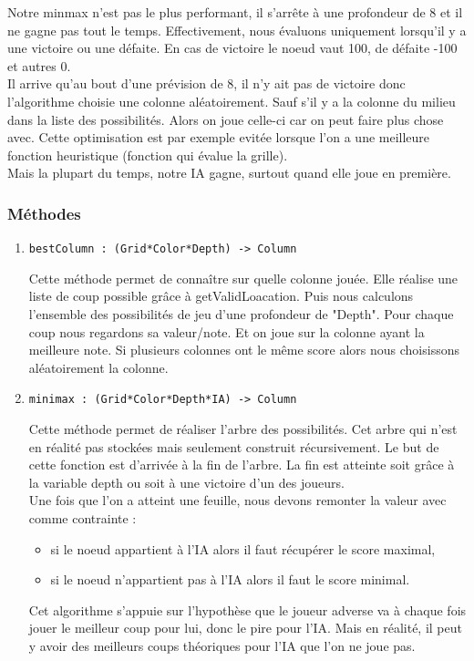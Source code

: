 \documentclass[11pt]{article}
\begin{document}
Notre minmax n'est pas le plus performant, il s'arrête à une profondeur de 8
et il ne gagne pas tout le temps. Effectivement, nous évaluons uniquement
lorsqu'il y a une victoire ou une défaite. En cas de victoire le noeud vaut
100, de défaite -100 et autres 0.\\

Il arrive qu'au bout d'une prévision de 8, il n'y ait pas de victoire donc
l'algorithme choisie une colonne aléatoirement. Sauf s'il y a la colonne du
milieu dans la liste des possibilités. Alors on joue celle-ci car on peut
faire plus chose avec. Cette optimisation est par exemple evitée lorsque
l'on a une meilleure fonction heuristique (fonction qui évalue la grille).\\

Mais la plupart du temps, notre IA gagne, surtout quand elle joue en
première.\\

\subsubsection{Méthodes}
\label{sec:orgcb16ecc}

\begin{enumerate}
\item \texttt{bestColumn : (Grid*Color*Depth) -> Column}
\label{sec:org0291f70}

Cette méthode permet de connaître sur quelle colonne jouée. 
Elle réalise une liste de coup possible grâce à getValidLoacation.
Puis nous calculons l'ensemble des possibilités de jeu d'une profondeur de
"Depth". 
Pour chaque coup nous regardons sa valeur/note. Et on joue sur la colonne
ayant la meilleure note. Si plusieurs colonnes ont le même score alors nous
choisissons aléatoirement la colonne.\\

\item \texttt{minimax : (Grid*Color*Depth*IA) -> Column}
\label{sec:orgbfc61b5}

Cette méthode permet de réaliser l'arbre des possibilités. Cet arbre qui
n'est en réalité pas stockées mais seulement construit récursivement. Le
but de cette fonction est d'arrivée à la fin de l'arbre. La fin est
atteinte soit grâce à la variable depth ou soit à une victoire d'un des
joueurs.\\

Une fois que l'on a atteint une feuille, nous devons remonter la valeur
avec comme contrainte :
\begin{itemize}
\item si le noeud appartient à l'IA alors il faut récupérer le score maximal,
\item si le noeud n'appartient pas à l'IA alors il faut le score minimal.\\
\end{itemize}

Cet algorithme s'appuie sur l'hypothèse que le  joueur adverse va à chaque
fois jouer le meilleur coup pour lui, donc le pire pour l'IA. Mais en
réalité, il peut y avoir des meilleurs coups théoriques pour l'IA que l'on
ne joue pas.\\
\end{enumerate}
\end{document}
